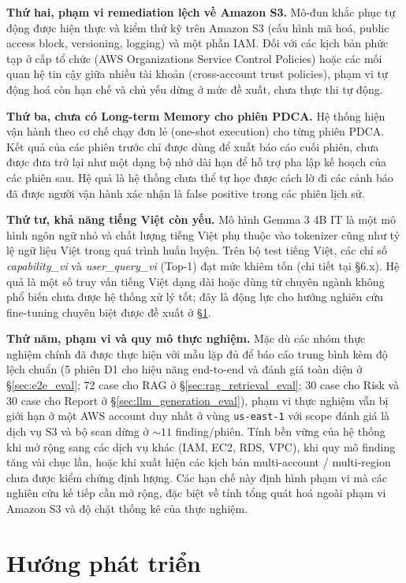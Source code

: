 \textbf{Thứ hai, phạm vi remediation lệch về Amazon S3.}
Mô-đun khắc phục tự động được hiện thực và kiểm thử kỹ trên Amazon S3 (cấu hình mã hoá, public access block, versioning, logging) và một phần IAM. Đối với các kịch bản phức tạp ở cấp tổ chức (AWS Organizations Service Control Policies) hoặc các mối quan hệ tin cậy giữa nhiều tài khoản (cross-account trust policies), phạm vi tự động hoá còn hạn chế và chủ yếu dừng ở mức đề xuất, chưa thực thi tự động.

\textbf{Thứ ba, chưa có Long-term Memory cho phiên PDCA.}
Hệ thống hiện vận hành theo cơ chế chạy đơn lẻ (one-shot execution) cho từng phiên PDCA. Kết quả của các phiên trước chỉ được dùng để xuất báo cáo cuối phiên, chưa được đưa trở lại như một dạng bộ nhớ dài hạn để hỗ trợ pha lập kế hoạch của các phiên sau. Hệ quả là hệ thống chưa thể tự học được cách lờ đi các cảnh báo đã được người vận hành xác nhận là false positive trong các phiên lịch sử.

\textbf{Thứ tư, khả năng tiếng Việt còn yếu.}
Mô hình Gemma 3 4B IT là một mô hình ngôn ngữ nhỏ và chất lượng tiếng Việt phụ thuộc vào tokenizer cũng như tỷ lệ ngữ liệu Việt trong quá trình huấn luyện. Trên bộ test tiếng Việt, các chỉ số \textit{capability\_vi} và \textit{user\_query\_vi} (Top-1) đạt mức khiêm tốn (chi tiết tại §6.x). Hệ quả là một số truy vấn tiếng Việt dạng dài hoặc dùng từ chuyên ngành không phổ biến chưa được hệ thống xử lý tốt; đây là động lực cho hướng nghiên cứu fine-tuning chuyên biệt được đề xuất ở §\ref{sec:future-work}.

\textbf{Thứ năm, phạm vi và quy mô thực nghiệm.}
Mặc dù các nhóm thực nghiệm chính đã được thực hiện với mẫu lặp đủ để báo cáo trung bình kèm độ lệch chuẩn (5 phiên D1 cho hiệu năng end-to-end và đánh giá toàn diện ở §\ref{sec:e2e_eval}; 72 case cho RAG ở §\ref{sec:rag_retrieval_eval}; 30 case cho Risk và 30 case cho Report ở §\ref{sec:llm_generation_eval}), phạm vi thực nghiệm vẫn bị giới hạn ở một AWS account duy nhất ở vùng \texttt{us-east-1} với scope đánh giá là dịch vụ S3 và bộ scan dừng ở $\sim 11$ finding/phiên. Tính bền vững của hệ thống khi mở rộng sang các dịch vụ khác (IAM, EC2, RDS, VPC), khi quy mô finding tăng vài chục lần, hoặc khi xuất hiện các kịch bản multi-account / multi-region chưa được kiểm chứng định lượng.
Các hạn chế này định hình phạm vi mà các nghiên cứu kế tiếp cần mở rộng, đặc biệt về tính tổng quát hoá ngoài phạm vi Amazon S3 và độ chặt thống kê của thực nghiệm.

\section{Hướng phát triển}
\label{sec:future-work}

